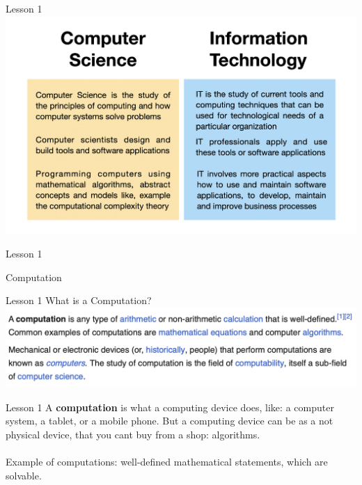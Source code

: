 \documentclass[aspectratio=1610]{beamer}
\begin{document}
\begin{frame}{Lesson 1}{}
\includegraphics[scale=0.15]{Images/csvsit.png}
\end{frame}

\begin{frame}{Lesson 1}{}
\begin{center}
\Huge Computation
\end{center}
\end{frame}

\begin{frame}{Lesson 1}{}
{\Huge{What is a Computation?}}
\includegraphics[scale=0.58]{Images/computation.png}
\end{frame}




\begin{frame}{Lesson 1}{}
\Large
A \textbf{computation} is what a \alert{computing device} does, like: a computer system, a tablet, or a mobile phone. But a computing device can be as a not physical device, that you cant buy from a shop: \alert{algorithms}.\\~\\

Example of computations: well-defined mathematical statements, which are solvable. 


\end{frame}
\end{document}
